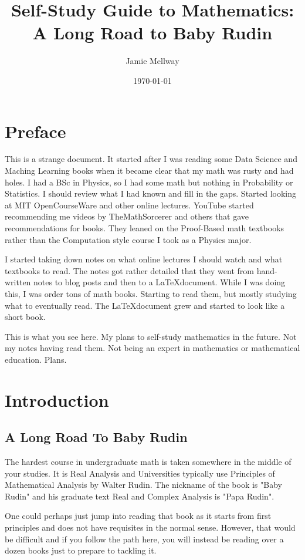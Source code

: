 \documentclass[openany,10pt]{book}
\title{Self-Study Guide to Mathematics:\\A Long Road to Baby Rudin}
\date{\today}
\author{Jamie Mellway}
\begin{document}
\maketitle

\setlength{\cftbeforechapskip}{3pt}
\tableofcontents

\chapter*{Preface}

This is a strange document.  It started after I was reading some Data Science and Maching Learning books when it became clear that my math was rusty and had holes.  I had a BSc in Physics, so I had some math but nothing in Probability or Statistics.  I should review what I had known and fill in the gaps.  Started looking at MIT OpenCourseWare and other online lectures.  YouTube started recommending me videos by TheMathSorcerer and others that gave recommendations for books.  They leaned on the Proof-Based math textbooks rather than the Computation style course I took as a Physics major.

I started taking down notes on what online lectures I should watch and what textbooks to read.  The notes got rather detailed that they went from hand-written notes to blog posts and then to a \LaTeX document. While I was doing this, I was order tons of math books.  Starting to read them, but mostly studying what to eventually read.  The \LaTeX document grew and started to look like a short book.

This is what you see here.  My plans to self-study mathematics in the future.  Not my notes having read them.  Not being an expert in mathematics or mathematical education.  Plans.

\chapter*{Introduction}


\section*{A Long Road To Baby Rudin}
The hardest course in undergraduate math is taken somewhere in the middle of your studies.  It is Real Analysis and Universities typically use Principles of Mathematical Analysis by Walter Rudin.  The nickname of the book is "Baby Rudin" and his graduate text Real and Complex Analysis is "Papa Rudin".

One could perhaps just jump into reading that book as it starts from first principles and does not have requisites in the normal sense.  However, that would be difficult and if you follow the path here, you will instead be reading over a dozen books just to prepare to tackling it.
\end{document}
